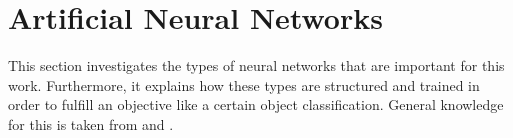 \section{Artificial Neural Networks}
\label{sec:neural-networks}
This section investigates the types of neural networks that are important for this work.
Furthermore, it explains how these types are structured and trained in order to fulfill an objective like a certain object classification.
General knowledge for this is taken from \cite{Goodfellow-et-al-2016} and \cite{cs231n}.






